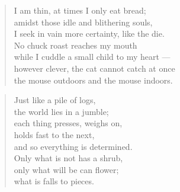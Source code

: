 

\begin{verse}
  I am thin, at times I only eat bread; \\
  amidst those idle and blithering souls, \\
  I seek in vain more certainty, like the die. \\
  No chuck roast reaches my mouth \\
  while I cuddle a small child to my heart --- \\
  however clever, the cat cannot catch at once \\
  the mouse outdoors and the mouse indoors.
\end{verse}

\bigskip



\begin{verse}
  Just like a pile of logs, \\
  the world lies in a jumble; \\
  each thing presses, weighs on, \\
  holds fast to the next, \\
  and so everything is determined. \\
  Only what is not has a shrub, \\
  only what will be can flower; \\
  what is falls to pieces.
\end{verse}

\newpage

\vspace*{-15mm}
\centeredornament



